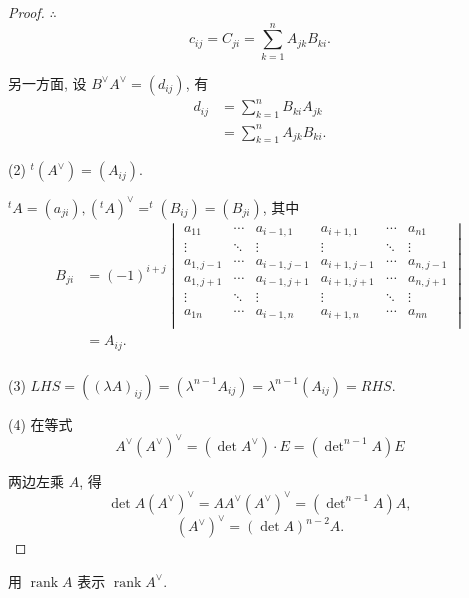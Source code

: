\documentclass{ctexart}
\begin{document}
\begin{proof}
    $\therefore$
    \[c_{ij}=C_{ji}=\sum\limits_{k=1}^nA_{jk}B_{ki}.\]

    另一方面, 设 $B^\vee A^\vee=(d_{ij})$, 有
    \begin{align*}
        d_{ij} & =\sum\limits_{k=1}^nB_{ki}A_{jk} \\
        & =\sum\limits_{k=1}^nA_{jk}B_{ki}.
    \end{align*}

    (2) $^t(A^\vee)=(A_{ij})$.

    $^tA=(a_{ji}),(^tA)^\vee=^t(B_{ij})=(B_{ji})$, 其中
    \begin{align*}
        B_{ji} & =(-1)^{i+j}\begin{vmatrix}
            a_{11} & \cdots & a_{i-1,1} & a_{i+1,1} & \cdots & a_{n1} \\
            \vdots & \ddots & \vdots & \vdots & \ddots & \vdots \\
            a_{1,j-1} & \cdots & a_{i-1,j-1} & a_{i+1,j-1} & \cdots & a_{n,j-1} \\
            a_{1,j+1} & \cdots & a_{i-1,j+1} & a_{i+1,j+1} & \cdots & a_{n,j+1} \\
            \vdots & \ddots & \vdots & \vdots & \ddots & \vdots \\
            a_{1n} & \cdots & a_{i-1,n} & a_{i+1,n} & \cdots & a_{nn} \\
        \end{vmatrix} \\
        & =A_{ij}. \\
    \end{align*}

    (3) $LHS=((\lambda A)_{ij})=(\lambda^{n-1}A_{ij})=\lambda^{n-1}(A_{ij})=RHS$.

    (4) 在等式
    \[A^\vee(A^\vee)^\vee=(\det A^\vee)\cdot E=(\det\nolimits^{n-1}A)E\]

    两边左乘 $A$, 得
    \[\det A(A^\vee)^\vee=AA^\vee(A^\vee)^\vee=(\det\nolimits^{n-1}A)A,\]
    \[(A^\vee)^\vee=(\det A)^{n-2}A.\]
\end{proof}
\begin{exercise}%
    用 $\operatorname{rank}A$ 表示 $\operatorname{rank}A^\vee$.
\end{exercise}
\end{document}
